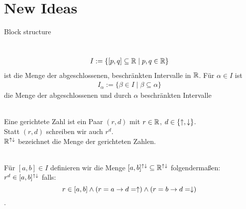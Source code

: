\chapter{New Ideas}

Block structure

\begin{nota}\ \\
    \begin{align*}
      I := \{[p,q] \subseteq \mathbb{R} \mid p,q \in \mathbb{R}\}
    \end{align*}
    ist die Menge der abgeschlossenen, beschränkten Intervalle in $\mathbb{R}$.
    Für $\alpha \in I$ ist
    \begin{align*}
        I_{\alpha} := \{ \beta \in I \mid \beta \subseteq \alpha\}
    \end{align*}
    die Menge der abgeschlossenen und durch $\alpha$ beschränkten Intervalle
\end{nota}



\begin{dfn}\ \\
    Eine gerichtete Zahl ist ein Paar $(r,d)$ mit $r \in \mathbb{R}$, $d \in \{\uparrow, \downarrow\}$.\\
    Statt $(r,d)$ schreiben wir auch $r^d$.\\
    $\mathbb{R}^{{\uparrow \downarrow}}$ bezeichnet die Menge der gerichteten Zahlen.
\end{dfn}

\begin{dfn}\ \\
    Für $[a,b] \in I$ definieren wir die Menge $[a,b]^{{\uparrow \downarrow}} \subseteq \mathbb{R}^{{\uparrow \downarrow}}$ folgendermaßen: $r^d \in [a,b]^{{\uparrow \downarrow}}$ falls:
    $$r \in [a,b] \land (r = a \to d=\uparrow) \land (r=b \to d=\downarrow)$$.
\end{dfn}

